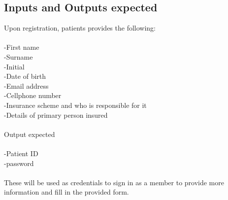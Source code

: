 \documentclass{article}
\begin{document}
\subsection*{Inputs and Outputs expected}

Upon registration, patients provides the following:\\\\
-First name\\
-Surname\\
-Initial\\
-Date of birth\\
-Email address\\
-Cellphone number\\
-Insurance scheme and who is responsible for it\\
-Details of primary person insured\\\\

Output expected\\\\
-Patient ID\\
-password\\\\

These will be used as credentials to sign in as a member to provide more information and fill in the provided form. 









	
	
\end{document}
